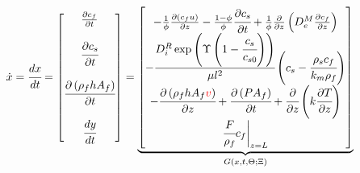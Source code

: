 \documentclass[a0,portrait]{a0poster}
\begin{document}
\begin{multicols}{2}
\begin{tcolorbox}[width=\linewidth, boxrule=0mm, sharp corners=all, colback=white]
\begin{align*}
	\dot{x} = \cfrac{d x}{d t} = 
	\begin{bmatrix}
		\frac{\partial c_f}{\partial t} \\
		\\
		\cfrac{\partial c_s}{\partial t} \\
		\\
		\cfrac{\partial \left(\rho_f h A_f\right)}{\partial t} \\
		\\
		\cfrac{d y}{d t}
	\end{bmatrix}
	=
\underbrace{\begin{bmatrix}
		-\frac{1}{\phi} \frac{\partial \left( c_f u\right)}{\partial z} - \frac{1-\phi}{\phi} \cfrac{\partial c_s}{\partial t} + \frac{1}{\phi} \frac{\partial}{\partial z} \left( D^M_e \frac{\partial c_f}{\partial z} \right) \\
		-\cfrac{ D_i^R \exp \left( \Upsilon \left( 1-\cfrac{ c_s }{c_{s0}} \right) \right) }{ \mu l^2 } \left( c_s  - \cfrac{\rho_s c_f }{ k_m \rho_f }  \right) \\
		- \cfrac{\partial \left( \rho_f h A_f {\color{red}v} \right)}{\partial z} + \cfrac{\partial \left(P A_f\right)}{\partial t} + \cfrac{\partial}{\partial z} \left( k \cfrac{\partial T}{\partial z} \right) \\
		\cfrac{F}{\rho_f} c_f \biggr\rvert_{z=L}
	\end{bmatrix}}_{G(x,t,\Theta;\Xi)}
\end{align*}


\end{tcolorbox}
\end{multicols}
\end{document}
